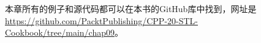 



本章所有的例子和源代码都可以在本书的GitHub库中找到，网址是\url{https://github.com/PacktPublishing/CPP-20-STL-Cookbook/tree/main/chap09}。